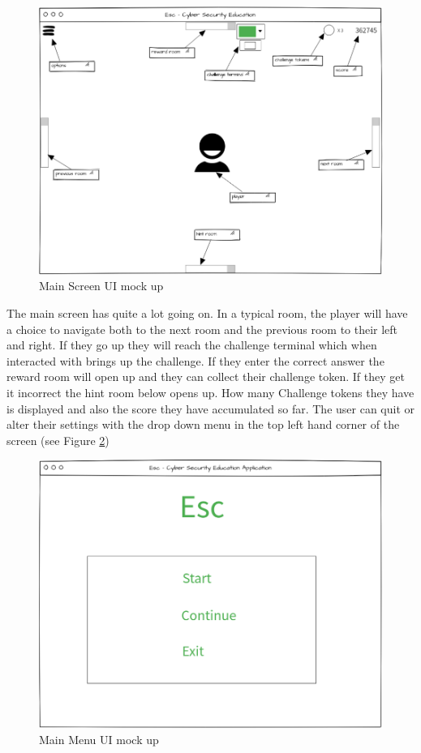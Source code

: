 \documentclass[12pt,a4paper]{article}
\begin{document}
\begin{figure}[h]
    \centering
    \includegraphics[width=1.0\textwidth]{Figs/Ui_main_screen.PNG} 
    \caption{Main Screen UI mock up} 
    \label{Mainscreen}
\end{figure}   

The main screen has quite a lot going on. In a typical room, the player will have a choice to navigate both to the next room and the previous room to their left and right. If they go up they will reach the challenge terminal which when interacted with brings up the challenge. If they enter the correct answer the reward room will open up and they can collect their challenge token. If they get it incorrect the hint room below opens up. How many Challenge tokens they have is displayed and also the score they have accumulated so far. The user can quit or alter their settings with the drop down menu in the top left hand corner of the screen (see Figure \ref{Mainmenu})

\begin{figure}[h]
    \centering
    \includegraphics[width=1.0\textwidth]{Figs/Ui_main_menu.PNG} 
    \caption{Main Menu UI mock up} 
    \label{Mainmenu}
\end{figure}   
\end{document}
